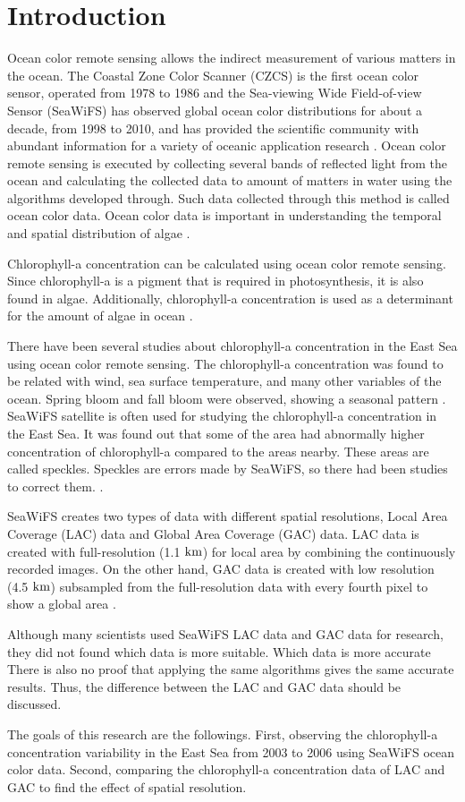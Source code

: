 \section{Introduction}

Ocean color remote sensing allows the indirect measurement of various matters in the ocean. The Coastal Zone Color Scanner (CZCS) is the first ocean color sensor, operated from 1978 to 1986 and the Sea-viewing Wide Field-of-view Sensor (SeaWiFS) has observed global ocean color distributions for about a decade, from 1998 to 2010, and has provided the scientific community with abundant information for a variety of oceanic application research \cite{kyung2013characteristics, hooker1992An}. Ocean color remote sensing is executed by collecting several bands of reflected light from the ocean and calculating the collected data to amount of matters in water using the algorithms developed through. Such data collected through this method is called ocean color data. Ocean color data is important in understanding the temporal and spatial distribution of algae \cite{kimhc2016surface}.

Chlorophyll-a concentration can be calculated using ocean color remote sensing. Since chlorophyll-a is a pigment that is required in photosynthesis, it is also found in algae. Additionally, chlorophyll-a concentration is used as a determinant for the amount of algae in ocean \cite{o2000ocean}. 

There have been several studies about chlorophyll-a concentration in the East Sea using ocean color remote sensing. The chlorophyll-a concentration was found to be related with wind, sea surface temperature, and many other variables of the ocean. Spring bloom and fall bloom were observed, showing a seasonal pattern \cite{yamada2004seasonal}. SeaWiFS satellite is often used for studying the chlorophyll-a concentration in the East Sea. It was found out that some of the area had abnormally higher concentration of chlorophyll-a compared to the areas nearby. These areas are called speckles. Speckles are errors made by SeaWiFS, so there had been studies to correct them. \cite{chae2009characteristics}. 

SeaWiFS creates two types of data with different spatial resolutions, Local Area Coverage (LAC) data and Global Area Coverage (GAC) data. LAC data is created with full-resolution (1.1 $\rm km$) for local area by combining the continuously recorded images. On the other hand, GAC data is created with low resolution (4.5 $\rm km$) subsampled from the full-resolution data with every fourth pixel to show a global area \cite{Seawifsres}. 

Although many scientists used SeaWiFS LAC data and GAC data for research, they did not found which data is more suitable. Which data is more accurate There is also no proof that applying the same algorithms gives the same accurate results. Thus, the difference between the LAC and GAC data should be discussed. 

The goals of this research are the followings. First, observing the chlorophyll-a concentration variability in the East Sea from 2003 to 2006 using SeaWiFS ocean color data. Second, comparing the chlorophyll-a concentration data of LAC and GAC to find the effect of spatial resolution.
